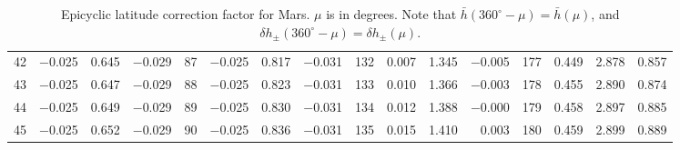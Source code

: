 \begin{table}[!h]
{\begin{tabular}{rrrr|rrrr|rrrr|crrr}
 42 & \tiny{ $-$0.025} &   0.645 & \tiny{ $-$0.029} &  87 & \tiny{ $-$0.025} &   0.817 & \tiny{ $-$0.031} & 132 & \tiny{  0.007} &   1.345 & \tiny{ $-$0.005} & 177 & \tiny{  0.449} &   2.878 & \tiny{  0.857}\\
 43 & \tiny{ $-$0.025} &   0.647 & \tiny{ $-$0.029} &  88 & \tiny{ $-$0.025} &   0.823 & \tiny{ $-$0.031} & 133 & \tiny{  0.010} &   1.366 & \tiny{ $-$0.003} & 178 & \tiny{  0.455} &   2.890 & \tiny{  0.874}\\
 44 & \tiny{ $-$0.025} &   0.649 & \tiny{ $-$0.029} &  89 & \tiny{ $-$0.025} &   0.830 & \tiny{ $-$0.031} & 134 & \tiny{  0.012} &   1.388 & \tiny{ $-$0.000} & 179 & \tiny{  0.458} &   2.897 & \tiny{  0.885}\\
 45 & \tiny{ $-$0.025} &   0.652 & \tiny{ $-$0.029} &  90 & \tiny{ $-$0.025} &   0.836 & \tiny{ $-$0.031} & 135 & \tiny{  0.015} &   1.410 & \tiny{  0.003} & 180 & \tiny{  0.459} &   2.899 & \tiny{  0.889}\\
 \end{tabular}}
\caption{Epicyclic latitude correction factor for Mars. $\mu$ is in degrees. Note that $\bar{h}(360^\circ-\mu) = \bar{h}(\mu)$, and $\delta h_{\pm}(360^\circ-\mu) = \delta h_{\pm}(\mu)$. }\label{tlat2m}
\end{table}

